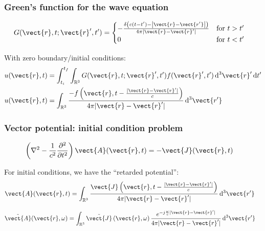 \documentclass[12 pt, compress, handout, intlimits]{beamer}
\renewcommand{\d}{\operatorname{d}\!}
\newcommand{\ft}[1]{\tilde{#1}}
\begin{document}
\note{}

\begin{frame}[fragile]
    \frametitle{Green's function for the wave equation}
    
    \begin{align*}
    G(\vect{r}, t; \vect{r}', t') &= \begin{cases} - \frac{\delta\left( c(t - t') - \left| \vect{r} - \vect{r'} \right| \right)}{4 \pi \left| \vect{r} - \vect{r}' \right|} & \text{for } t > t' \\ 0 & \text{for } t < t' \end{cases}
    \end{align*}

    With zero boundary/initial conditions:
    \begin{align*}
        u(\vect{r}, t) &= \int_{t_i}^{t_f} \int_{\mathbb{R}^3} G(\vect{r}, t; \vect{r}', t') f(\vect{r}', t') \d^3 \vect{r}' \d t'
        \\
        u(\vect{r}, t) &= \int_{\mathbb{R}^3} \frac{-f\left(\vect{r}, t - \frac{|\vect{r} - \vect{r}'|}{c}\right)}{4 \pi |\vect{r} - \vect{r}'|} \d^3 \vect{r'}
    \end{align*}
    
\end{frame}

\note{}

\begin{frame}[fragile]
    \frametitle{Vector potential: initial condition problem}
    
    \begin{align*}
        \left( \nabla^2 - \frac{1}{c^2} \frac{\partial^2}{\partial t^2} \right) \vect{A}(\vect{r}, t) &= - \vect{J}(\vect{r}, t)
    \end{align*}
    
    For initial conditions, we have the ``retarded potential'':
    \begin{align*}
        \vect{A}(\vect{r}, t) &= \int_{\mathbb{R}^3} \frac{\vect{J}\left(\vect{r}, t - \frac{|\vect{r} - \vect{r}'|}{c}\right)}{4 \pi |\vect{r} - \vect{r}'|} \d^3 \vect{r'}
    \end{align*}

    \begin{align*}
        \ft{\vect{A}}(\vect{r}, \omega) &= \int_{\mathbb{R}^3} \ft{\vect{J}}\left(\vect{r}, \omega \right) \frac{e^{- j \frac{\omega}{c} | \vect{r} - \vect{r}' |}}{4 \pi |\vect{r} - \vect{r}'|} \d^3 \vect{r'}
    \end{align*}
    
    
\end{frame}
\end{document}
